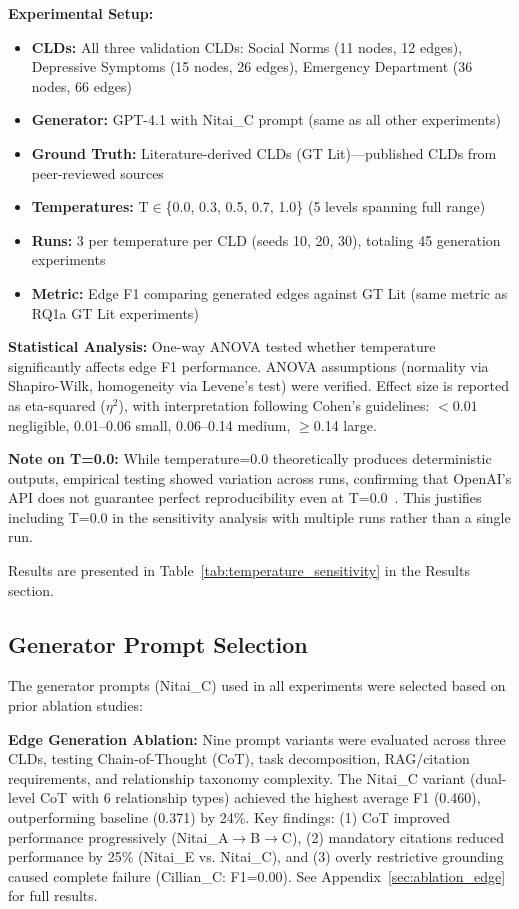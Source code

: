 \textbf{Experimental Setup:}
\begin{itemize}[noitemsep]
    \item \textbf{CLDs:} All three validation CLDs: Social Norms (11 nodes, 12 edges), Depressive Symptoms (15 nodes, 26 edges), Emergency Department (36 nodes, 66 edges)
    \item \textbf{Generator:} GPT-4.1 with Nitai\_C prompt (same as all other experiments)
    \item \textbf{Ground Truth:} Literature-derived CLDs (GT Lit)---published CLDs from peer-reviewed sources
    \item \textbf{Temperatures:} T$\in$\{0.0, 0.3, 0.5, 0.7, 1.0\} (5 levels spanning full range)
    \item \textbf{Runs:} 3 per temperature per CLD (seeds 10, 20, 30), totaling 45 generation experiments
    \item \textbf{Metric:} Edge F1 comparing generated edges against GT Lit (same metric as RQ1a GT Lit experiments)
\end{itemize}

\textbf{Statistical Analysis:} One-way ANOVA tested whether temperature significantly affects edge F1 performance. ANOVA assumptions (normality via Shapiro-Wilk, homogeneity via Levene's test) were verified. Effect size is reported as eta-squared ($\eta^2$), with interpretation following Cohen's guidelines: $<0.01$ negligible, 0.01--0.06 small, 0.06--0.14 medium, $\geq$0.14 large.

\textbf{Note on T=0.0:} While temperature=0.0 theoretically produces deterministic outputs, empirical testing showed variation across runs, confirming that OpenAI's API does not guarantee perfect reproducibility even at T=0.0~\cite{openai2024api}. This justifies including T=0.0 in the sensitivity analysis with multiple runs rather than a single run.

Results are presented in Table~\ref{tab:temperature_sensitivity} in the Results section.

\subsection{Generator Prompt Selection}

The generator prompts (Nitai\_C) used in all experiments were selected based on prior ablation studies:

\textbf{Edge Generation Ablation:} Nine prompt variants were evaluated across three CLDs, testing Chain-of-Thought (CoT), task decomposition, RAG/citation requirements, and relationship taxonomy complexity. The Nitai\_C variant (dual-level CoT with 6 relationship types) achieved the highest average F1 (0.460), outperforming baseline (0.371) by 24\%. Key findings: (1) CoT improved performance progressively (Nitai\_A$\rightarrow$B$\rightarrow$C), (2) mandatory citations reduced performance by 25\% (Nitai\_E vs. Nitai\_C), and (3) overly restrictive grounding caused complete failure (Cillian\_C: F1=0.00). See Appendix~\ref{sec:ablation_edge} for full results.

